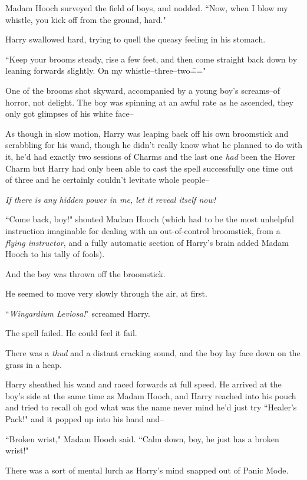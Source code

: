 Madam Hooch surveyed the field of boys, and nodded. ``Now, when I blow my whistle, you kick off from the ground, hard."

Harry swallowed hard, trying to quell the queasy feeling in his stomach.

``Keep your brooms steady, rise a few feet, and then come straight back down by leaning forwards slightly. On my whistle\---three\---two\==="

One of the brooms shot skyward, accompanied by a young boy's screams\---of horror, not delight. The boy was spinning at an awful rate as he ascended, they only got glimpses of his white face\---

As though in slow motion, Harry was leaping back off his own broomstick and scrabbling for his wand, though he didn't really know what he planned to do with it, he'd had exactly two sessions of Charms and the last one \emph{had} been the Hover Charm but Harry had only been able to cast the spell successfully one time out of three and he certainly couldn't levitate whole people\---

\emph{If there is any hidden power in me, let it reveal itself \emph{now}!}

``Come back, boy!" shouted Madam Hooch (which had to be the most unhelpful instruction imaginable for dealing with an out-of-control broomstick, from a \emph{flying instructor}, and a fully automatic section of Harry's brain added Madam Hooch to his tally of fools).

And the boy was thrown off the broomstick.

He seemed to move very slowly through the air, at first.

``\emph{Wingardium Leviosa!}" screamed Harry.

The spell failed. He could feel it fail.

There was a \emph{thud} and a distant cracking sound, and the boy lay face down on the grass in a heap.

Harry sheathed his wand and raced forwards at full speed. He arrived at the boy's side at the same time as Madam Hooch, and Harry reached into his pouch and tried to recall oh god what was the name never mind he'd just try ``Healer's Pack!" and it popped up into his hand and\---

``Broken wrist," Madam Hooch said. ``Calm down, boy, he just has a broken wrist!"

There was a sort of mental lurch as Harry's mind snapped out of Panic Mode.

